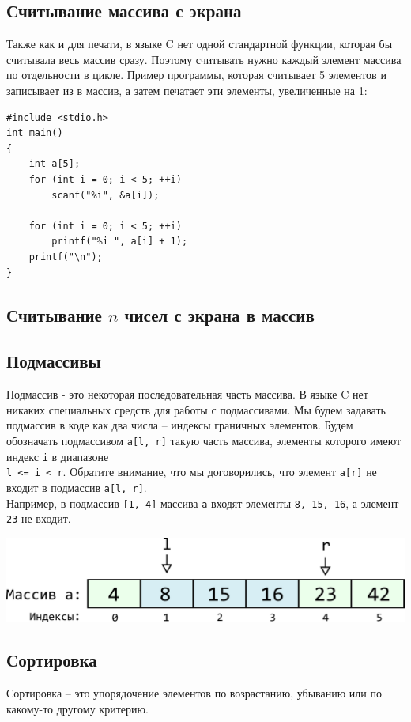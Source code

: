 \documentclass[10pt]{article}
\begin{document}
\subsection*{Считывание массива с экрана}
Также как и для печати, в языке C нет одной стандартной функции, которая бы считывала весь массив сразу.
Поэтому считывать нужно каждый элемент массива по отдельности в цикле. Пример программы, которая считывает 5 элементов и записывает из в массив, а затем печатает эти элементы, увеличенные на 1:
\begin{lstlisting}
#include <stdio.h>
int main()
{
    int a[5];
    for (int i = 0; i < 5; ++i)
        scanf("%i", &a[i]);

    for (int i = 0; i < 5; ++i)
        printf("%i ", a[i] + 1);
    printf("\n");
}
\end{lstlisting}


\subsection*{Считывание $n$ чисел с экрана в массив}


\newpage
\subsection*{Подмассивы}
Подмассив - это некоторая последовательная часть массива. В языке C нет никаких специальных средств для работы с подмассивами. Мы будем задавать подмассив в коде как два числа -- индексы граничных элементов. Будем обозначать подмассивом \texttt{a[l, r]} такую часть массива, элементы которого имеют индекс \texttt{i} в диапазоне \\
\texttt{l <= i < r}. Обратите внимание, что мы договорились, что элемент \texttt{a[r]} не входит в подмассив \texttt{a[l, r]}.\\

Например, в подмассив \texttt{[1, 4]} массива \texttt{a} входят элементы \texttt{8, 15, 16}, а элемент \texttt{23} не входит.
\begin{center}
\includegraphics[scale=0.8]{../images/array_slice.png}
\end{center}


\subsection*{Сортировка}
Сортировка -- это упорядочение элементов по возрастанию, убыванию или по какому-то другому критерию.
\end{document}

